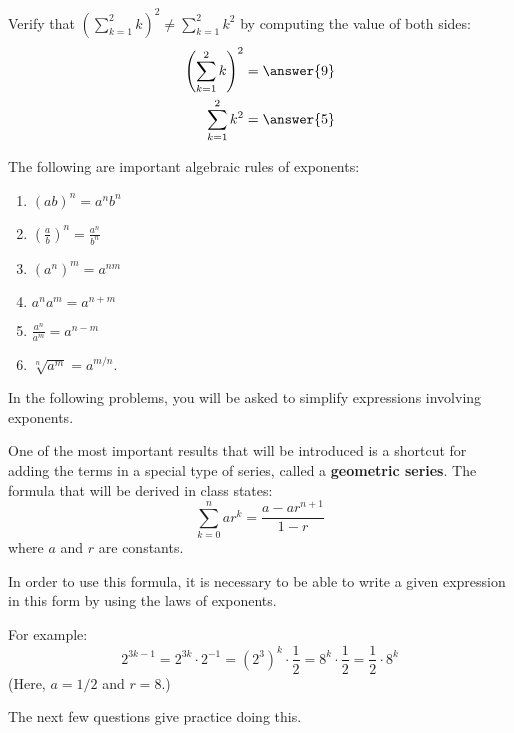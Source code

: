 \documentclass{ximera}
\begin{document}
\begin{problem}
  Verify that $\left(\sum_{k = 1}^2 k\right)^2 \ne \sum_{k = 1}^2 k^2$ by computing the value of both sides:
  \begin{align*}
      \left(\sum_{k = 1}^2 k\right)^2 &= \answer{9} \\
      \sum_{k = 1}^2 k^2  &= \answer{5}
  \end{align*}
\end{problem}


\begin{problem}
  The following are important algebraic rules of exponents:
  \begin{enumerate}
    \item $(ab)^n = a^n b^n$
    \item $\left( \frac{a}{b} \right)^n = \frac{a^n}{b^n}$
    \item $(a^n)^m = a^{nm}$
    \item $a^n a^m = a^{n+m}$
    \item $\frac{a^n}{a^m} = a^{n - m}$
    \item $\sqrt[n]{a^m} = a^{m/n}$.
  \end{enumerate}
  In the following problems, you will be asked to simplify expressions involving exponents.
  \begin{multipleChoice}
  \end{multipleChoice} 
\end{problem}



\begin{problem}
  One of the most important results that will be introduced is a shortcut for adding the terms in a special type of series, called a \textbf{geometric series}.
  The formula that will be derived in class states:
  \[
    \sum_{k = 0}^n a r^k = \frac{a - ar^{n+1}}{1 - r}
  \]
  where $a$ and $r$ are constants.
  
  In order to use this formula, it is necessary to be able to write a given expression in this form by using the laws of exponents.
  
  For example:
  \[
    2^{3k - 1} = 2^{3k} \cdot 2^{-1} = (2^3)^k \cdot \frac{1}{2} = 8^k \cdot \frac{1}{2} = \frac{1}{2} \cdot 8^k
  \]
  (Here, $a = 1/2$ and $r = 8$.)
  
  The next few questions give practice doing this.
  
  \begin{multipleChoice}
  \end{multipleChoice}
\end{problem}
\end{document}
